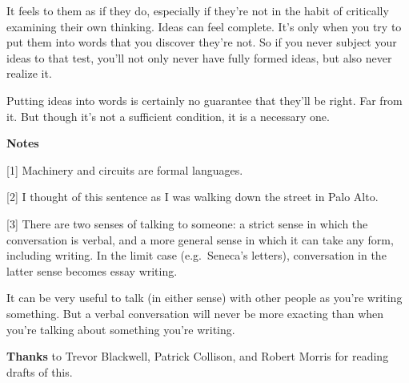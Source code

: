 It feels to them as if they do, especially if they're not in the habit
of critically examining their own thinking. Ideas can feel complete.
It's only when you try to put them into words that you discover they're
not. So if you never subject your ideas to that test, you'll not only
never have fully formed ideas, but also never realize it.

Putting ideas into words is certainly no guarantee that they'll be
right. Far from it. But though it's not a sufficient condition, it is a
necessary one.

\textbf{Notes}

{[}1{]} Machinery and circuits are formal languages.

{[}2{]} I thought of this sentence as I was walking down the street in
Palo Alto.

{[}3{]} There are two senses of talking to someone: a strict sense in
which the conversation is verbal, and a more general sense in which it
can take any form, including writing. In the limit case (e.g.~Seneca's
letters), conversation in the latter sense becomes essay writing.

It can be very useful to talk (in either sense) with other people as
you're writing something. But a verbal conversation will never be more
exacting than when you're talking about something you're writing.

\textbf{Thanks} to Trevor Blackwell, Patrick Collison, and Robert Morris
for reading drafts of this.
